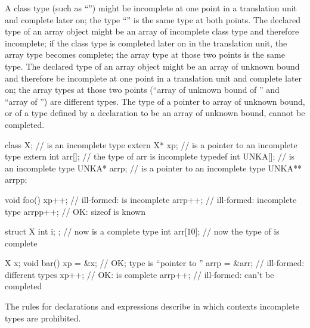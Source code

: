 \pnum
A class type (such as ``'') might be incomplete at one
point in a translation unit and complete later on; the type
``'' is the same type at both points. The declared type
of an array object might be an array of incomplete class type and
therefore incomplete; if the class type is completed later on in the
translation unit, the array type becomes complete; the array type at
those two points is the same type. The declared type of an array object
might be an array of unknown bound and therefore be incomplete at one
point in a translation unit and complete later on; the array types at
those two points (``array of unknown bound of '' and ``array of
 '') are different types. The type of a pointer to array of
unknown bound, or of a type defined by a  declaration to
be an array of unknown bound, cannot be completed. \begin{example}

%
\begin{codeblock}
class X;                        //  is an incomplete type
extern X* xp;                   //  is a pointer to an incomplete type
extern int arr[];               // the type of arr is incomplete
typedef int UNKA[];             //  is an incomplete type
UNKA* arrp;                     //  is a pointer to an incomplete type
UNKA** arrpp;

void foo() {
  xp++;                         // ill-formed:  is incomplete
  arrp++;                       // ill-formed: incomplete type
  arrpp++;                      // OK: sizeof  is known
}

struct X { int i; };            // now  is a complete type
int  arr[10];                   // now the type of  is complete

X x;
void bar() {
  xp = &x;                      // OK; type is ``pointer to ''
  arrp = &arr;                  // ill-formed: different types
  xp++;                         // OK:   is complete
  arrp++;                       // ill-formed:  can't be completed
}
\end{codeblock}
\end{example}

\pnum
\begin{note} The rules for declarations and expressions describe in which
contexts incomplete types are prohibited. \end{note}

